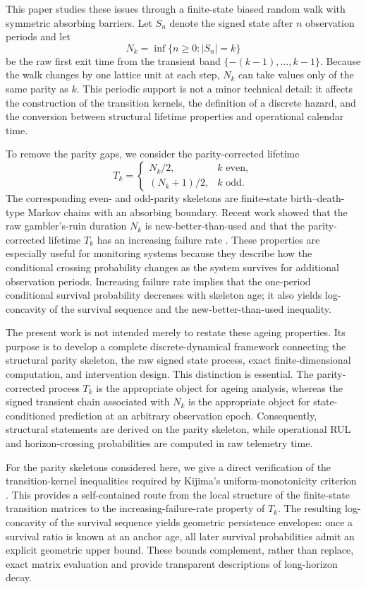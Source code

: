 \documentclass[pdflatex,sn-mathphys-num]{sn-jnl}
\theoremstyle{definition}
\numberwithin{equation}{section}
\begin{document}
This paper studies these issues through a finite-state biased random walk with
symmetric absorbing barriers. Let \(S_n\) denote the signed state after \(n\)
observation periods and let
\[
N_k=\inf\{n\geq 0:|S_n|=k\}
\]
be the raw first exit time from the transient band
\(\{-(k-1),\ldots,k-1\}\). Because the walk changes by one lattice unit at each
step, \(N_k\) can take values only of the same parity as \(k\). This periodic
support is not a minor technical detail: it affects the construction of the
transition kernels, the definition of a discrete hazard, and the conversion
between structural lifetime properties and operational calendar time.

To remove the parity gaps, we consider the parity-corrected lifetime
\[
T_k=
\begin{cases}
N_k/2, & k \text{ even},\\[1mm]
(N_k+1)/2, & k \text{ odd}.
\end{cases}
\]
The corresponding even- and odd-parity skeletons are finite-state
birth--death-type Markov chains with an absorbing boundary. Recent work showed
that the raw gambler's-ruin duration \(N_k\) is new-better-than-used and that
the parity-corrected lifetime \(T_k\) has an increasing failure rate
\cite{ross2023duration,wang2025analysis1}. These properties are especially
useful for monitoring systems because they describe how the conditional
crossing probability changes as the system survives for additional observation
periods. Increasing failure rate implies that the one-period conditional
survival probability decreases with skeleton age; it also yields
log-concavity of the survival sequence and the new-better-than-used inequality.

The present work is not intended merely to restate these ageing properties.
Its purpose is to develop a complete discrete-dynamical framework connecting
the structural parity skeleton, the raw signed state process, exact
finite-dimensional computation, and intervention design. This distinction is
essential. The parity-corrected process \(T_k\) is the appropriate object for
ageing analysis, whereas the signed transient chain associated with \(N_k\) is
the appropriate object for state-conditioned prediction at an arbitrary
observation epoch. Consequently, structural statements are derived on the
parity skeleton, while operational RUL and horizon-crossing probabilities are
computed in raw telemetry time.

For the parity skeletons considered here, we give a direct verification of the
transition-kernel inequalities required by Kijima's uniform-monotonicity
criterion \cite{masaaki1989uniform,liu2025bidirectional}. This provides a
self-contained route from the local structure of the finite-state transition
matrices to the increasing-failure-rate property of \(T_k\). The resulting
log-concavity of the survival sequence yields geometric persistence envelopes:
once a survival ratio is known at an anchor age, all later survival
probabilities admit an explicit geometric upper bound. These bounds complement,
rather than replace, exact matrix evaluation and provide transparent
descriptions of long-horizon decay.
\end{document}
